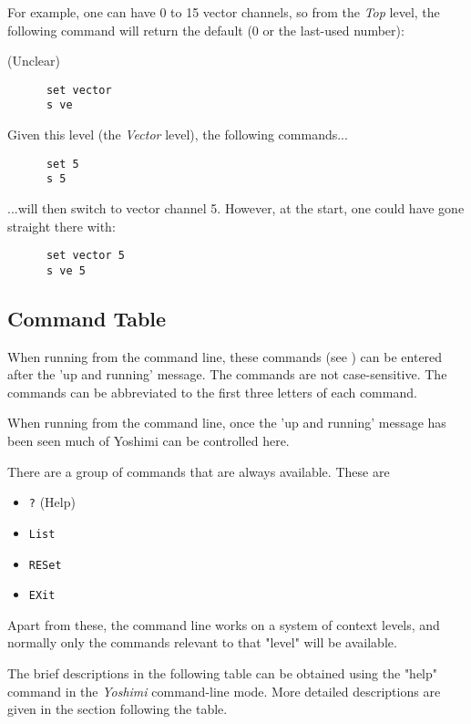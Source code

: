    For example, one can have 0 to 15 vector channels, so from the
   \textsl{Top} level, the following command
   will return the default  (0 or the last-used number):

   (Unclear)

   \begin{verbatim}
      set vector
      s ve
   \end{verbatim}

   Given this level (the \textsl{Vector} level), the following commands...

   \begin{verbatim}
      set 5 
      s 5
   \end{verbatim}

   ...will then switch to vector channel 5.
   However, at the start, one could have gone straight there with:

   \begin{verbatim}
      set vector 5
      s ve 5
   \end{verbatim}

\subsection{Command Table}
\label{subsec:command_line_command_table}

   When running from the command line, these commands
   (see )
   can be entered after the 'up and running' message.
   The commands are not case-sensitive.
   The commands can be abbreviated to the first three letters of each command.

   When running from the command line, once the 'up and running' message has
   been seen much of Yoshimi can be controlled here.

   There are a group of commands that are always available. These are

   \begin{itemize}
      \item \texttt{?} (Help)
      \item \texttt{List}
      \item \texttt{RESet}
      \item \texttt{EXit}
   \end{itemize}

   Apart from these, the command line works on a system of context levels, and
   normally only the commands relevant to that "level" will be available.

   The brief descriptions in the following table can be obtained
   using the "help" command in the \textsl{Yoshimi} command-line mode.
   More detailed descriptions are given in the section following the table.

